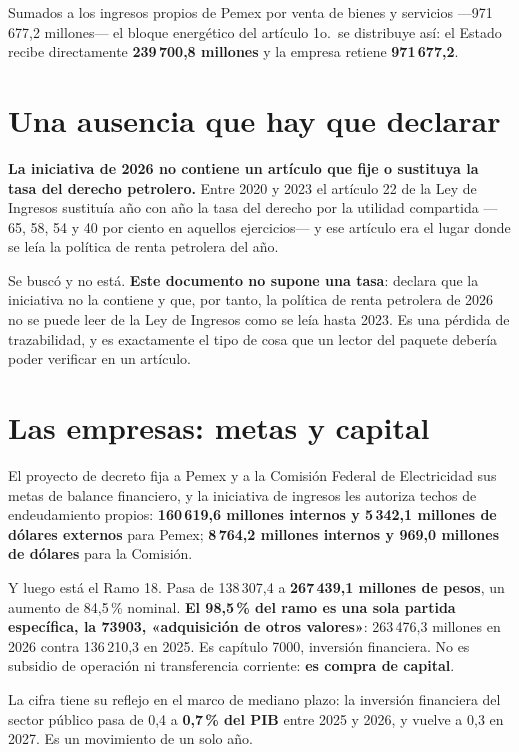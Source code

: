 Sumados a los ingresos propios de Pemex por venta de bienes y servicios ---971\,677,2
millones--- el bloque energético del artículo 1o.\ se distribuye así: el Estado recibe
directamente \textbf{239\,700,8 millones} y la empresa retiene \textbf{971\,677,2}.

\section{Una ausencia que hay que declarar}

\textbf{La iniciativa de 2026 no contiene un artículo que fije o sustituya la tasa del derecho
petrolero.} Entre 2020 y 2023 el artículo 22 de la Ley de Ingresos sustituía año con año la
tasa del derecho por la utilidad compartida ---65, 58, 54 y 40 por ciento en aquellos
ejercicios--- y ese artículo era el lugar donde se leía la política de renta petrolera del
año.

Se buscó y no está. \textbf{Este documento no supone una tasa}: declara que la iniciativa no
la contiene y que, por tanto, la política de renta petrolera de 2026 no se puede leer de la
Ley de Ingresos como se leía hasta 2023. Es una pérdida de trazabilidad, y es exactamente el
tipo de cosa que un lector del paquete debería poder verificar en un artículo.

\section{Las empresas: metas y capital}

El proyecto de decreto fija a Pemex y a la Comisión Federal de Electricidad sus metas de
balance financiero, y la iniciativa de ingresos les autoriza techos de endeudamiento propios:
\textbf{160\,619,6 millones internos y 5\,342,1 millones de dólares externos} para Pemex;
\textbf{8\,764,2 millones internos y 969,0 millones de dólares} para la Comisión.

Y luego está el Ramo 18. Pasa de 138\,307,4 a \textbf{267\,439,1 millones de pesos}, un
aumento de 84,5\,\% nominal. \textbf{El 98,5\,\% del ramo es una sola partida específica, la
73903, «adquisición de otros valores»}: 263\,476,3 millones en 2026 contra 136\,210,3 en 2025.
Es capítulo 7000, inversión financiera. No es subsidio de operación ni transferencia
corriente: \textbf{es compra de capital}.

La cifra tiene su reflejo en el marco de mediano plazo: la inversión financiera del sector
público pasa de 0,4 a \textbf{0,7\,\% del PIB} entre 2025 y 2026, y vuelve a 0,3 en 2027. Es
un movimiento de un solo año.

